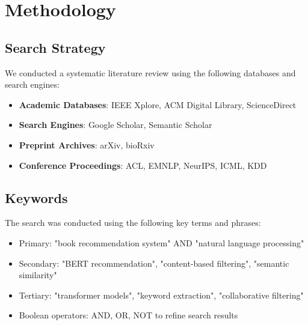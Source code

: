 \documentclass[12pt,a4paper]{article}
\begin{document}

\section{Methodology}

\subsection{Search Strategy}
We conducted a systematic literature review using the following databases and search engines:
\begin{itemize}
    \item \textbf{Academic Databases}: IEEE Xplore, ACM Digital Library, ScienceDirect
    \item \textbf{Search Engines}: Google Scholar, Semantic Scholar
    \item \textbf{Preprint Archives}: arXiv, bioRxiv
    \item \textbf{Conference Proceedings}: ACL, EMNLP, NeurIPS, ICML, KDD
\end{itemize}

\subsection{Keywords}
The search was conducted using the following key terms and phrases:
\begin{itemize}
    \item Primary: "book recommendation system" AND "natural language processing"
    \item Secondary: "BERT recommendation", "content-based filtering", "semantic similarity"
    \item Tertiary: "transformer models", "keyword extraction", "collaborative filtering"
    \item Boolean operators: AND, OR, NOT to refine search results
\end{itemize}
\end{document}
